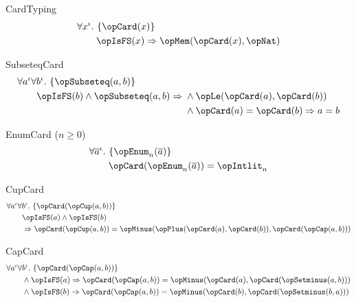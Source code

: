 \documentclass[11pt, a4paper, oneside]{article}
\begin{document}
\begin{axioms}
\item[CardTyping] \[
        \begin{aligned}
            &\forall x^\idv.\, \st{ \opCard(x) } \\
            &\qquad \opIsFS(x) \imp \opMem(\opCard(x), \opNat)
        \end{aligned}
    \]

\item[SubseteqCard] \[
        \begin{aligned}
            &\forall a^\idv \forall b^\idv.\, \st{ \opSubseteq(a, b) } \\
            &\qquad \opIsFS(b) \wedge \opSubseteq(a, b) \imp \begin{aligned}[t]
                &\wedge \opLe(\opCard(a), \opCard(b)) \\
                &\wedge \opCard(a) = \opCard(b) \imp a = b
            \end{aligned}
        \end{aligned}
    \]

\item[EnumCard ($n \ge 0$)] \[
        \begin{aligned}
            &\forall \overline{a}^\idv.\, \st{ \opEnum_n(\overline{a}) } \\
            &\qquad \opCard(\opEnum_n(\overline{a})) = \opIntlit_n
        \end{aligned}
    \]

\item[CupCard] \[
        \begin{aligned}
            &\forall a^\idv \forall b^\idv.\, \st{ \opCard(\opCup(a, b)) } \\
            &\qquad \opIsFS(a) \wedge \opIsFS(b) \\
            &\qquad \imp \opCard(\opCup(a, b)) = \opMinus(\opPlus(\opCard(a), \opCard(b)), \opCard(\opCap(a, b)))
        \end{aligned}
    \]

\item[CapCard] \[
        \begin{aligned}
            &\forall a^\idv \forall b^\idv.\, \st{ \opCard(\opCap(a, b)) } \\
            &\qquad \begin{aligned}[t]
                &\wedge \opIsFS(a) \imp \opCard(\opCap(a, b)) = \opMinus(\opCard(a), \opCard(\opSetminus(a, b))) \\
                &\wedge \opIsFS(b) \imp \opCard(\opCap(a, b)) = \opMinus(\opCard(b), \opCard(\opSetminus(b, a)))
            \end{aligned}
        \end{aligned}
    \]


\end{axioms}
\end{document}
